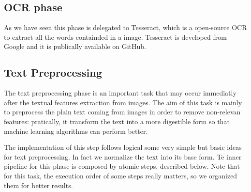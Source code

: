 \documentclass[10pt,twocolumn,letterpaper]{article}
\begin{document}
\subsection{OCR phase}
As we have seen this phase is delegated to Tesseract, which is a open-source OCR to extract all the words containded in a image. Tesseract is developed from Google and it is publically available on GitHub. 

\subsection{Text Preprocessing}

The text preprocessing phase is an important task that may occur
immediatly after the textual features extraction from images. The aim
of this task is mainly to preprocess the plain text coming from images
in order to remove non-relevan features: pratically, it transform the
text into a more digestible form so that machine learning algorithms
can perform better.

The implementation of this step follows logical some very simple but
basic ideas for text preprocessing. In fact we normalize the text into
its base form. Te inner pipeline for this phase is composed by atomic
steps, described below. Note that for this task, the execution order of some steps really matters, so we organized them for better results. 
\end{document}
